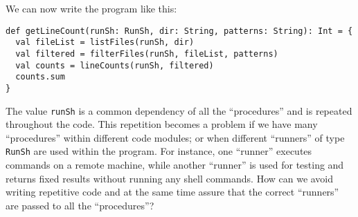 We can now write the program like this:
\begin{lstlisting}
def getLineCount(runSh: RunSh, dir: String, patterns: String): Int = {
  val fileList = listFiles(runSh, dir)
  val filtered = filterFiles(runSh, fileList, patterns)
  val counts = lineCounts(runSh, filtered)
  counts.sum
}
\end{lstlisting}
The value \lstinline!runSh! is a common dependency of all the \textsf{``}procedures\textsf{''}
and is repeated throughout the code. This repetition becomes a problem
if we have many \textsf{``}procedures\textsf{''} within different code modules; or
when different \textsf{``}runners\textsf{''} of type \lstinline!RunSh! are used within
the program. For instance, one \textsf{``}runner\textsf{''} executes commands on a
remote machine, while another \textsf{``}runner\textsf{''} is used for testing and
returns fixed results without running any shell commands. How can
we avoid writing repetitive code and at the same time assure that
the correct \textsf{``}runners\textsf{''} are passed to all the \textsf{``}procedures\textsf{''}?


